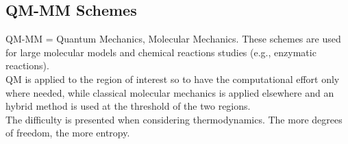 \subsection{QM-MM Schemes}
QM-MM = Quantum Mechanics, Molecular Mechanics. These schemes are used for large molecular models and chemical reactions studies (e.g., enzymatic reactions).\\
QM is applied to the region of interest so to have the computational effort only where needed,  while classical molecular mechanics is applied elsewhere and an hybrid method is used at the threshold of the two regions.\\
The difficulty is presented when considering thermodynamics. The more degrees of freedom, the more entropy.\\
